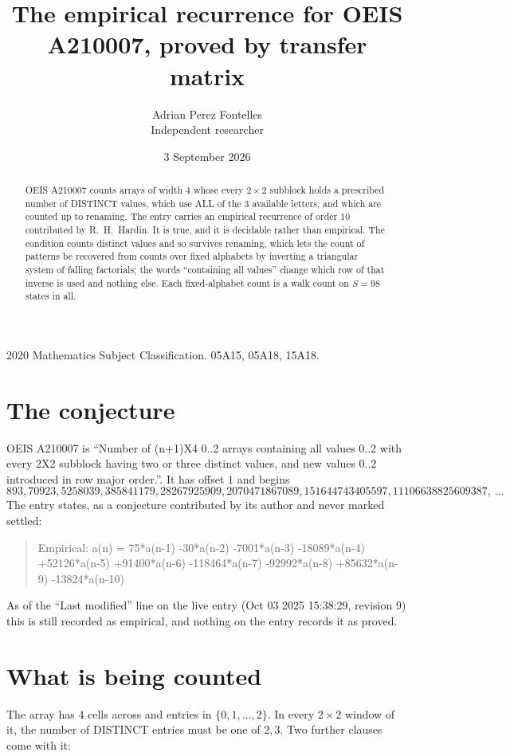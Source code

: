 \documentclass[11pt,a4paper]{article}
\title{The empirical recurrence for OEIS A210007, proved by transfer matrix}
\author{Adrian Perez Fontelles\\ \small Independent researcher}
\date{3 September 2026}
\theoremstyle{plain}
\theoremstyle{definition}
\begin{document}
\maketitle

\begin{abstract}
OEIS A210007 counts arrays of width $4$ whose every $2\times2$ subblock holds a
prescribed number of DISTINCT values, which use ALL of the $3$ available letters, and which
are counted up to renaming. The entry carries an empirical recurrence of order $10$
contributed by R.~H.~Hardin. It is true, and it is decidable rather than empirical. The
condition counts distinct values and so survives renaming, which lets the count of patterns be
recovered from counts over fixed alphabets by inverting a triangular system of falling
factorials; the words ``containing all values'' change which row of that inverse is used and
nothing else. Each fixed-alphabet count is a walk count on $S=98$ states in all.
\end{abstract}

\noindent\small 2020 Mathematics Subject Classification. 05A15, 05A18, 15A18.\normalsize

\section{The conjecture}

OEIS A210007 is ``Number of (n+1)X4 0..2 arrays containing all values 0..2 with every 2X2 subblock having two or three distinct values, and new values 0..2 introduced in row major order.''. It has offset $1$ and begins
\[
893, 70923, 5258039, 385841179, 28267925909, 2070471867089, 151644743405597, 11106638825609387,\ \dots
\]
The entry states, as a conjecture contributed by its author and never marked settled:
\begin{quote}
Empirical: a(n) = 75*a(n-1) -30*a(n-2) -7001*a(n-3) -18089*a(n-4) +52126*a(n-5) +91400*a(n-6) -118464*a(n-7) -92992*a(n-8) +85632*a(n-9) -13824*a(n-10)
\end{quote}
As of the ``Last modified'' line on the live entry (Oct 03 2025 15:38:29, revision 9) this is still
recorded as empirical, and nothing on the entry records it as proved.

\section{What is being counted}

The array has $4$ cells across and entries in $\{0,1,\dots,2\}$. In every
$2\times2$ window of it, the number of DISTINCT entries must be one of $2, 3$. Two
further clauses come with it:
\end{document}
